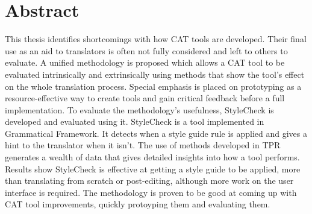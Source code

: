 

\begingroup
\let\clearpage\relax
\let\cleardoublepage\relax
\let\cleardoublepage\relax

\chapter*{Abstract} %

\noindent This thesis identifies shortcomings with how \acf{CAT} tools are developed. Their final use as an aid to translators is often not fully considered and left to others to evaluate. A unified methodology is proposed which allows a \acs{CAT} tool to be evaluated intrinsically and extrinsically using methods that show the tool's effect on the whole translation process. Special emphasis is placed on prototyping as a resource-effective way to create tools and gain critical feedback before a full implementation. To evaluate the methodology's usefulness, StyleCheck is developed and evaluated using it. StyleCheck is a tool implemented in Grammatical Framework. It detects when a style guide rule is applied and gives a hint to the translator when it isn't. The use of methods developed in \acl{TPR} generates a wealth of data that gives detailed insights into how a tool performs. Results show StyleCheck is effective at getting a style guide to be applied, more than translating from scratch or post-editing, although more work on the user interface is required. The methodology is proven to be good at coming up with \acs{CAT} tool improvements, quickly protoyping them and evaluating them.

\endgroup			

\vfill
